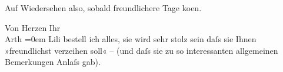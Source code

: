 \pstart
           Auf Wiedersehen also, sobald freundlichere Tage ko{\geminationm}en.\pend
           
\pstart
           Von Herzen Ihr{\\[\baselineskip]}\spacefill\mbox{Arth}\pend
           \leftskip=0em{}
\pstart
           \noindent{}Lili bestell ich alles, sie wird sehr stolz
                  sein daſs sie Ihnen »freundlichst verzeihen soll« – (und daſs sie zu so
                  interessanten allgemeinen Bemerkungen Anlaſs gab).\pend
           \endnumbering{}  
      